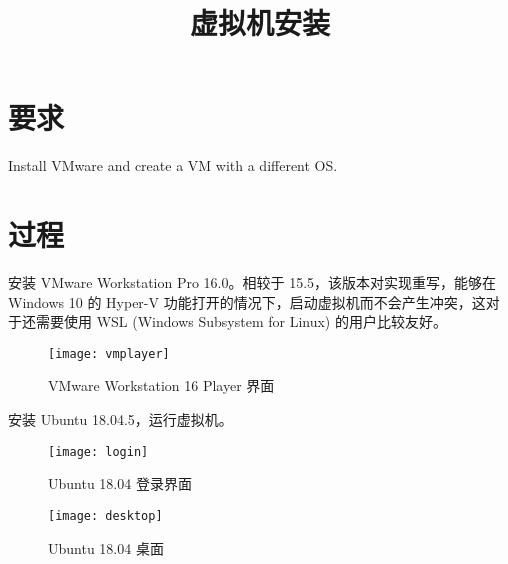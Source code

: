 

    \title{虚拟机安装}
    \maketitle
    \section*{要求}
    Install VMware and create a VM with a different OS.
    \section*{过程}
    安装 VMware Workstation Pro 16.0。相较于 15.5，该版本对实现重写，能够在 Windows 10 的 Hyper-V 功能打开的情况下，启动虚拟机而不会产生冲突，这对于还需要使用 WSL (Windows Subsystem for Linux) 的用户比较友好。
    \begin{figure}[h]
        \centering\texttt{[image: vmplayer]}
        \caption{VMware Workstation 16 Player 界面}
    \end{figure}

    安装 Ubuntu 18.04.5，运行虚拟机。
    \begin{figure}[h]
        \centering\texttt{[image: login]}
        \caption{Ubuntu 18.04 登录界面}
    \end{figure}
    \begin{figure}[h]
        \centering\texttt{[image: desktop]}
        \caption{Ubuntu 18.04 桌面}
    \end{figure}
    

